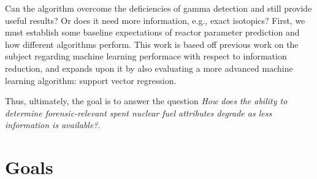 Can the algorithm overcome the deficiencies of gamma detection and still
provide useful results? Or does it need more information, e.g., exact
isotopics? First, we must establish some baseline expectations of reactor
parameter prediction and how different algorithms perform. This work is based
off previous work on the subject \cite{dayman_feasibility_2013} regarding
machine learning performace with respect to information reduction, and expands
upon it by also evaluating a more advanced machine learning algorithm: support
vector regression. 

Thus, ultimately, the goal is to answer the question \textit{How
does the ability to determine forensic-relevant spent nuclear fuel attributes
degrade as less information is available?}. 

\section{Goals}

